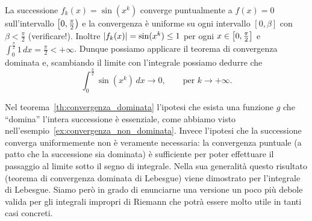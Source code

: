 \begin{example}
La successione $f_k(x) = \sin(x^k)$ converge puntualmente a $f(x)=0$ sull'intervallo
$\left[0,\frac \pi2\right)$ e la convergenza è uniforme su ogni intervallo $[0,\beta]$
con $\beta < \frac \pi 2$ (verificare!).
Inoltre ${\left|f_k(x)\right|} = \sin(x^k) \le 1$ per ogni $x\in {\left[ 0,\frac \pi 2 \right]}$
e $\int_0^{\frac \pi 2} 1\, dx = \frac \pi 2 < +\infty$.
Dunque possiamo applicare il teorema di convergenza dominata e,
scambiando il limite con l'integrale possiamo dedurre che
\[
  \int_0^{\frac \pi 2} \sin (x^k)\, dx \to 0, \qquad \text{per $k\to +\infty$.}
\]
\end{example}

Nel teorema~\ref{th:convergenza_dominata}
l'ipotesi che esista una funzione $g$ che ``domina'' l'intera successione 
è essenziale, come abbiamo visto nell'esempio~\ref{ex:convergenza_non_dominata}.
Invece l'ipotesi che la successione converga uniformemente non è veramente necessaria:
la convergenza puntuale (a patto che la successione sia dominata) è sufficiente 
per poter effettuare il passaggio al limite sotto il segno di integrale.
Nella sua generalità questo risultato (teorema di convergenza dominata di Lebesgue) 
viene dimostrato per l'integrale di Lebesgue.
%
%
%
%
%
Siamo però in grado di enunciarne una versione un poco più debole valida per gli 
integrali impropri di Riemann che potrà essere molto utile in tanti casi concreti.

